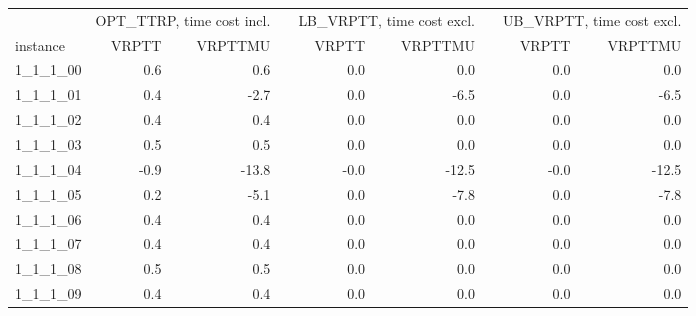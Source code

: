 \setlength\LTleft{-1in}
\setlength\LTright{-1in}
\begin{longtable}{lrrcrrcrr}
\toprule
& \multicolumn{2}{c}{OPT\_TTRP, time cost incl.} & \phantom{a}& %
\multicolumn{2}{c}{LB\_VRPTT, time cost excl.}&\phantom{a} & \multicolumn{2}{c}{UB\_VRPTT, time cost excl.} \\
\cmidrule{2-3} \cmidrule{5-6} \cmidrule{8-9}
instance &  VRPTT &  VRPTTMU &&  VRPTT &  VRPTTMU & & VRPTT &  VRPTTMU \\
\midrule \endhead
1\_1\_1\_00      &                 0.6 &                   0.6 &&                  0.0 &                    0.0 &&                  0.0 &                    0.0 \\
1\_1\_1\_01      &                 0.4 &                  -2.7 &&                  0.0 &                   -6.5 &&                  0.0 &                   -6.5 \\
1\_1\_1\_02      &                 0.4 &                   0.4 &&                  0.0 &                    0.0 &&                  0.0 &                    0.0 \\
1\_1\_1\_03      &                 0.5 &                   0.5 &&                  0.0 &                    0.0 &&                  0.0 &                    0.0 \\
1\_1\_1\_04      &                -0.9 &                 -13.8 &&                 -0.0 &                  -12.5 &&                 -0.0 &                  -12.5 \\
1\_1\_1\_05      &                 0.2 &                  -5.1 &&                  0.0 &                   -7.8 &&                  0.0 &                   -7.8 \\
1\_1\_1\_06      &                 0.4 &                   0.4 &&                  0.0 &                    0.0 &&                  0.0 &                    0.0 \\
1\_1\_1\_07      &                 0.4 &                   0.4 &&                  0.0 &                    0.0 &&                  0.0 &                    0.0 \\
1\_1\_1\_08      &                 0.5 &                   0.5 &&                  0.0 &                    0.0 &&                  0.0 &                    0.0 \\
1\_1\_1\_09      &                 0.4 &                   0.4 &&                  0.0 &                    0.0 &&                  0.0 &                    0.0 \\

\end{longtable}
